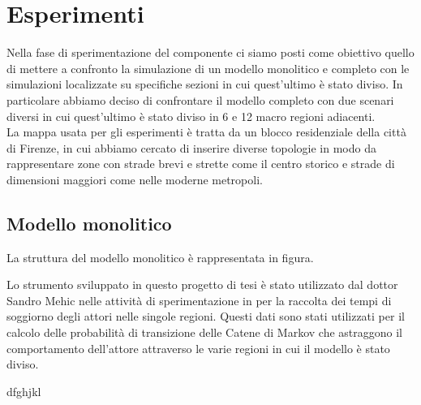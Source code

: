 \chapter{Esperimenti}
Nella fase di sperimentazione del componente ci siamo posti come obiettivo quello di mettere a confronto la simulazione di un modello monolitico e completo con le simulazioni localizzate su specifiche sezioni in cui quest'ultimo è stato diviso. In particolare abbiamo deciso di confrontare il modello completo con due scenari diversi in cui quest'ultimo è stato diviso in 6 e 12 macro regioni adiacenti.\\
La mappa usata per gli esperimenti è tratta da un blocco residenziale della città di Firenze, in cui abbiamo cercato di inserire diverse topologie in modo da rappresentare zone con strade brevi e strette come il centro storico e strade di dimensioni maggiori come nelle moderne metropoli.\\
\section{Modello monolitico}
La struttura del modello monolitico è rappresentata in figura. %

Lo strumento sviluppato in questo progetto di tesi è stato utilizzato dal dottor Sandro Mehic nelle attività di sperimentazione in \cite{esperimenti-sandro} per la raccolta dei tempi di soggiorno degli attori nelle singole regioni. Questi dati sono stati utilizzati per il calcolo delle probabilità di transizione delle Catene di Markov che astraggono il comportamento dell'attore attraverso le varie regioni in cui il modello è stato diviso.

dfghjkl
 